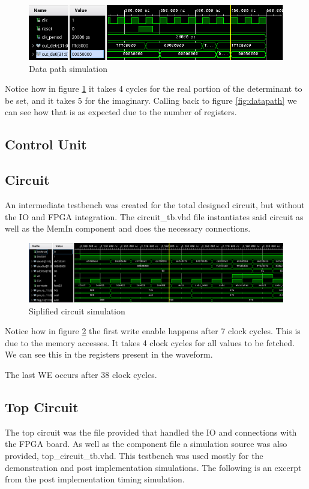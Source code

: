 \documentclass[12pt]{article}
\begin{document}
\begin{figure}[!htp]
	\centering
	\includegraphics[width=0.5\linewidth]{images/simDataPath.png}
	\caption{Data path simulation}
	\label{fig:simData}
\end{figure}

Notice how in figure \ref{fig:simData} it takes 4 cycles for the real portion of the determinant to be set, and it takes 5 for the imaginary. Calling back to figure \ref{fig:datapath} we can see how that is as expected due to the number of registers.

\subsection{Control Unit}
\subsection{Circuit}
An intermediate testbench was created for the total designed circuit, but without the IO and FPGA integration.
The circuit\_tb.vhd file instantiates said circuit as well as the MemIn component and does the necessary connections.

\begin{figure}[!htp]
	\centering
	\includegraphics[width=0.7\linewidth]{images/simCircuit.png}
	\caption{Siplified circuit simulation}
	\label{fig:simCircuit}
\end{figure}

Notice how in figure \ref{fig:simCircuit} the first write enable happens after 7 clock cycles. This is due to the memory accesses. It takes 4 clock cycles for all values to be fetched. We can see this in the registers present in the waveform.

The last WE occurs after 38 clock cycles.

\subsection{Top Circuit}
The top circuit was the file provided that handled the IO and connections with the FPGA board. As well as the component file a simulation source was also provided, top\_circuit\_tb.vhd. 
This testbench was used mostly for the demonstration and post implementation simulations. The following is an excerpt from the post implementation timing simulation.
\end{document}
